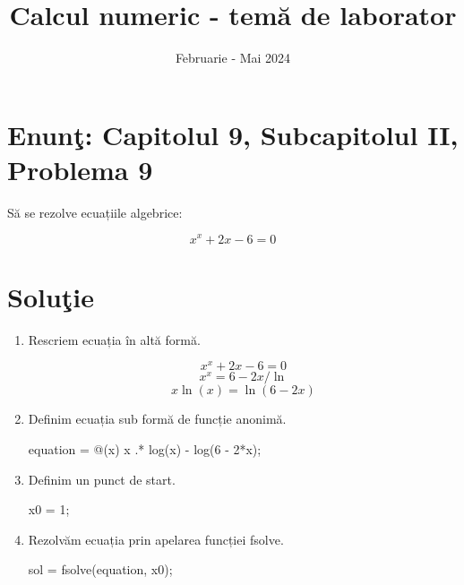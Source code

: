\documentclass{article}
\begin{document}
\title{Calcul numeric - tem\u{a} de laborator}

\author{}

\date{Februarie - Mai 2024}

\maketitle              %








\section*{Enun\c{t}: Capitolul 9, Subcapitolul II, Problema 9}

S\u{a} se rezolve  ecuațiile algebrice:

\begin{center}
\[
x^x +2x -6  = 0
\]
\end{center}

\section*{Solu\c{t}ie}

\begin{center}
\begin{enumerate}
\item Rescriem ecuația în altă formă. \\
 \begin{center}
    \[
x^x +2x -6  = 0  
\] 
\[
x^x = 6-2x / \ln
\] 
\[
x\ln(x) = \ln(6-2x)
\] 
    \end{center}
\item Definim ecuația sub formă de funcție anonimă. \\
\begin{center}
    equation = @(x) x .* log(x) - log(6 - 2*x);
    \end{center}
\item Definim un punct de start. \\
\begin{center}
    x0 = 1;
    \end{center}
\item Rezolvăm ecuația prin apelarea funcției fsolve. \\
\begin{center}
    sol = fsolve(equation, x0);
    \end{center}
\end{enumerate}
\end{center}
\end{document}
